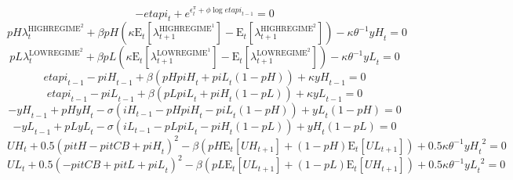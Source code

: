 \begin{equation}
-{e\!t\!a\!p\!i}_{t} + e^{\epsilon^{\pi}_{t} + {\phi} {\log{{e\!t\!a\!p\!i}_{t-1}}}} = 0
\end{equation}
\begin{equation}
{{p\!H}} {\lambda^{\mathrm{HIGHREGIME}^{\mathrm{2}}}_{t}} + {\beta} {{p\!H}} \left({\kappa} {\mathrm{E}_{t}\left[\lambda^{\mathrm{HIGHREGIME}^{\mathrm{1}}}_{t+1}\right]} - \mathrm{E}_{t}\left[\lambda^{\mathrm{HIGHREGIME}^{\mathrm{2}}}_{t+1}\right]\right) - {\kappa} {\theta}^{-1} {{y\!H}_{t}} = 0
\end{equation}
\begin{equation}
{{p\!L}} {\lambda^{\mathrm{LOWREGIME}^{\mathrm{2}}}_{t}} + {\beta} {{p\!L}} \left({\kappa} {\mathrm{E}_{t}\left[\lambda^{\mathrm{LOWREGIME}^{\mathrm{1}}}_{t+1}\right]} - \mathrm{E}_{t}\left[\lambda^{\mathrm{LOWREGIME}^{\mathrm{2}}}_{t+1}\right]\right) - {\kappa} {\theta}^{-1} {{y\!L}_{t}} = 0
\end{equation}
\begin{equation}
{e\!t\!a\!p\!i}_{t-1} - {p\!i\!H}_{t-1} + {\beta} \left({{p\!H}} {{p\!i\!H}_{t}} + {{p\!i\!L}_{t}} \left(1 - {p\!H}\right)\right) + {\kappa} {{y\!H}_{t-1}} = 0
\end{equation}
\begin{equation}
{e\!t\!a\!p\!i}_{t-1} - {p\!i\!L}_{t-1} + {\beta} \left({{p\!L}} {{p\!i\!L}_{t}} + {{p\!i\!H}_{t}} \left(1 - {p\!L}\right)\right) + {\kappa} {{y\!L}_{t-1}} = 0
\end{equation}
\begin{equation}
-{y\!H}_{t-1} + {{p\!H}} {{y\!H}_{t}} - {\sigma} \left({i\!H}_{t-1} - {{p\!H}} {{p\!i\!H}_{t}} - {{p\!i\!L}_{t}} \left(1 - {p\!H}\right)\right) + {{y\!L}_{t}} \left(1 - {p\!H}\right) = 0
\end{equation}
\begin{equation}
-{y\!L}_{t-1} + {{p\!L}} {{y\!L}_{t}} - {\sigma} \left({i\!L}_{t-1} - {{p\!L}} {{p\!i\!L}_{t}} - {{p\!i\!H}_{t}} \left(1 - {p\!L}\right)\right) + {{y\!H}_{t}} \left(1 - {p\!L}\right) = 0
\end{equation}
\begin{equation}
{U\!H}_{t} + 0.5\left({p\!i\!t\!H} - {p\!i\!t\!C\!B} + {p\!i\!H}_{t}\right)^{2} - {\beta} \left({{p\!H}} {\mathrm{E}_{t}\left[{U\!H}_{t+1}\right]} + \left(1 - {p\!H}\right) {\mathrm{E}_{t}\left[{U\!L}_{t+1}\right]}\right) + 0.5{\kappa} {\theta}^{-1} {{y\!H}_{t}}^{2} = 0
\end{equation}
\begin{equation}
{U\!L}_{t} + 0.5\left(-{p\!i\!t\!C\!B} + {p\!i\!t\!L} + {p\!i\!L}_{t}\right)^{2} - {\beta} \left({{p\!L}} {\mathrm{E}_{t}\left[{U\!L}_{t+1}\right]} + \left(1 - {p\!L}\right) {\mathrm{E}_{t}\left[{U\!H}_{t+1}\right]}\right) + 0.5{\kappa} {\theta}^{-1} {{y\!L}_{t}}^{2} = 0
\end{equation}
